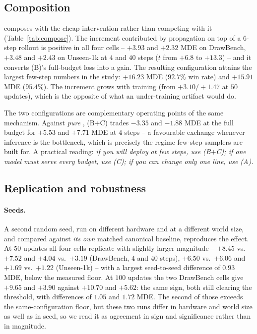 \subsection{Composition}
\label{sec:exp:compose}



\MSP composes with the cheap intervention rather than competing with it
(Table~\ref{tab:compose}). The increment contributed by propagation on top of a $6$-step
rollout is positive in all four cells -- $+3.93$ and $+2.32$ MDE on DrawBench,
$+3.48$ and $+2.43$ on Unseen-1k at $4$ and $40$ steps ($t$ from $+6.8$ to $+13.3$) -- and
it converts (B)'s full-budget loss into a gain. The resulting configuration attains the
largest few-step numbers in the study: $+16.23$ MDE ($92.7\%$ win rate) and $+15.91$ MDE
($95.4\%$). The increment grows with training (from $+3.10/+1.47$ at $50$ updates), which
is the opposite of what an under-training artifact would do.

The two configurations are complementary operating points of the same mechanism. Against
\emph{pure} \MSP, (B$+$C) trades $-3.35$ and $-1.88$ MDE at the full budget for $+5.53$ and
$+7.71$ MDE at $4$ steps -- a favourable exchange whenever inference is the bottleneck,
which is precisely the regime few-step samplers are built for. A practical reading:
\emph{if you will deploy at few steps, use (B$+$C); if one model must serve every budget,
use (C); if you can change only one line, use (A).}

\subsection{Replication and robustness}
\label{sec:exp:robust}

\paragraph{Seeds.} A second random seed, run on different hardware and at a different
world size, and compared against \emph{its own} matched canonical baseline, reproduces the
effect. At $50$ updates all four cells replicate with slightly larger magnitude --
$+8.45$ vs.\ $+7.52$ and $+4.04$ vs.\ $+3.19$ (DrawBench, $4$ and $40$ steps),
$+6.50$ vs.\ $+6.06$ and $+1.69$ vs.\ $+1.22$ (Unseen-1k) -- with a largest seed-to-seed
difference of $0.93$ MDE, below the measured floor. At $100$ updates the two DrawBench
cells give $+9.65$ and $+3.90$ against $+10.70$ and $+5.62$: the same sign, both still
clearing the threshold, with differences of $1.05$ and $1.72$ MDE. The second of those
exceeds the same-configuration floor, but these two runs differ in hardware and world size
as well as in seed, so we read it as agreement in sign and significance rather than in
magnitude.

